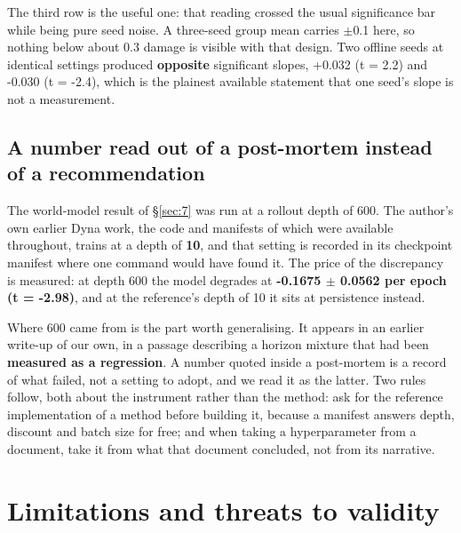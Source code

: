 \documentclass[11pt]{article}
\begin{document}
The third row is the useful one: that reading crossed the usual significance bar while being pure seed noise. A three-seed group mean carries $\pm$0.1 here, so nothing below about 0.3 damage is visible with that design. Two offline seeds at identical settings produced \textbf{opposite} significant slopes, +0.032 (t = 2.2) and -0.030 (t = -2.4), which is the plainest available statement that one seed's slope is not a measurement.

\subsection{A number read out of a post-mortem instead of a recommendation}
\label{sec:9.5}

The world-model result of \S\ref{sec:7} was run at a rollout depth of 600. The author's own earlier Dyna work, the code and manifests of which were available throughout, trains at a depth of \textbf{10}, and that setting is recorded in its checkpoint manifest where one command would have found it. The price of the discrepancy is measured: at depth 600 the model degrades at \textbf{-0.1675 $\pm$ 0.0562 per epoch (t = -2.98)}, and at the reference's depth of 10 it sits at persistence instead.

Where 600 came from is the part worth generalising. It appears in an earlier write-up of our own, in a passage describing a horizon mixture that had been \textbf{measured as a regression}. A number quoted inside a post-mortem is a record of what failed, not a setting to adopt, and we read it as the latter. Two rules follow, both about the instrument rather than the method: ask for the reference implementation of a method before building it, because a manifest answers depth, discount and batch size for free; and when taking a hyperparameter from a document, take it from what that document concluded, not from its narrative.


\section{Limitations and threats to validity}
\label{sec:10}
\end{document}
